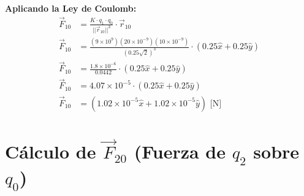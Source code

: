 \documentclass[12pt,letterpaper]{article}
\begin{document}
\vspace{0.5cm}
\textbf{Aplicando la Ley de Coulomb:}
\begin{align*}
    \vec{F}_{10} &= \frac{K \cdot q_1 \cdot q_0}{||\vec{r}_{10}||^3} \cdot \vec{r}_{10} \\[0.3cm]
    \vec{F}_{10} &= \frac{(9 \times 10^9)(20 \times 10^{-9})(10 \times 10^{-9})}{(0.25\sqrt{2})^3} \cdot (0.25\hat{x} + 0.25\hat{y}) \\[0.3cm]
    \vec{F}_{10} &= \frac{1.8 \times 10^{-6}}{0.0442} \cdot (0.25\hat{x} + 0.25\hat{y}) \\[0.3cm]
    \vec{F}_{10} &= 4.07 \times 10^{-5} \cdot (0.25\hat{x} + 0.25\hat{y}) \\[0.3cm]
    \vec{F}_{10} &= \boxed{(1.02 \times 10^{-5}\hat{x} + 1.02 \times 10^{-5}\hat{y}) \text{ [N]}}
\end{align*}

\section*{C\'alculo de $\vec{F}_{20}$ (Fuerza de $q_2$ sobre $q_0$)}
\end{document}
